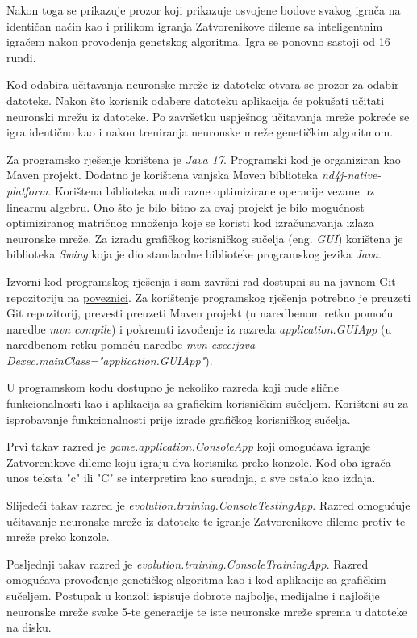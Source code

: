 \documentclass[zavrsnirad]{fer}
\begin{document}
	Nakon toga se prikazuje prozor koji prikazuje osvojene bodove svakog igrača na identičan način kao i prilikom igranja Zatvorenikove dileme sa inteligentnim igračem nakon provođenja genetskog algoritma. Igra se ponovno sastoji od 16 rundi.
	
	Kod odabira učitavanja neuronske mreže iz datoteke otvara se prozor za odabir datoteke. Nakon što korisnik odabere datoteku aplikacija će pokušati učitati neuronski mrežu iz datoteke. Po završetku uspješnog učitavanja mreže pokreće se igra identično kao i nakon treniranja neuronske mreže genetičkim algoritmom.
	
	Za programsko rješenje korištena je \textit{Java 17}. Programski kod je organiziran kao Maven projekt. Dodatno je korištena vanjska Maven biblioteka \textit{nd4j-native-platform}. Korištena biblioteka nudi razne optimizirane operacije vezane uz linearnu algebru. Ono što je bilo bitno za ovaj projekt je bilo mogućnost optimiziranog matričnog množenja koje se koristi kod izračunavanja izlaza neuronske mreže. Za izradu grafičkog korisničkog sučelja (eng. \textit{GUI}) korištena je biblioteka \textit{Swing} koja je dio standardne biblioteke programskog jezika \textit{Java}.
	
	Izvorni kod programskog rješenja i sam završni rad dostupni su na javnom Git repozitoriju na \href{https://github.com/PetarBelosevic/Prisoner-s-Dilemma-AI.git}{poveznici}. Za korištenje programskog rješenja potrebno je preuzeti Git repozitorij, prevesti preuzeti Maven projekt (u naredbenom retku pomoću naredbe \textit{mvn compile}) i pokrenuti izvođenje iz razreda \textit{application.GUIApp} (u naredbenom retku pomoću naredbe \textit{mvn exec:java -Dexec.mainClass="application.GUIApp"}).
	
	U programskom kodu dostupno je nekoliko razreda koji nude slične funkcionalnosti kao i aplikacija sa grafičkim korisničkim sučeljem. Korišteni su za isprobavanje funkcionalnosti prije izrade grafičkog korisničkog sučelja.
	
	Prvi takav razred je \textit{game.application.ConsoleApp} koji omogućava igranje Zatvorenikove dileme koju igraju dva korisnika preko konzole. Kod oba igrača unos teksta "c" ili "C" se interpretira kao suradnja, a sve ostalo kao izdaja.
	
	Slijedeći takav razred je \textit{evolution.training.ConsoleTestingApp}. Razred omogućuje učitavanje neuronske mreže iz datoteke te igranje Zatvorenikove dileme protiv te mreže preko konzole.
	
	Posljednji takav razred je \textit{evolution.training.ConsoleTrainingApp}. Razred omogućava provođenje genetičkog algoritma kao i kod aplikacije sa grafičkim sučeljem. Postupak u konzoli ispisuje dobrote najbolje, medijalne i najlošije neuronske mreže svake 5-te generacije te iste neuronske mreže sprema u datoteke na disku.

\end{document}
